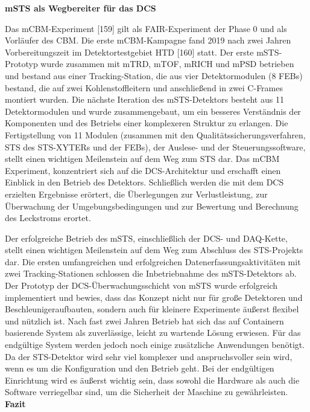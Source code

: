 \bigbreak
\textbf{\gls{mSTS} als Wegbereiter für das DCS}
\bigbreak

Das \gls{mCBM}-Experiment [159] gilt als FAIR-Experiment der Phase 0 und als Vorläufer des CBM. Die erste \gls{mCBM}-Kampagne fand 2019 nach zwei Jahren Vorbereitungszeit im Detektortestgebiet HTD [160] statt. Der erste \gls{mSTS}-Prototyp wurde zusammen mit mTRD, mTOF, mRICH und mPSD betrieben und bestand aus einer Tracking-Station, die aus vier Detektormodulen (8 FEBs) bestand, die auf zwei Kohlenstoffleitern und anschließend in zwei C-Frames montiert wurden. Die nächste Iteration des \gls{mSTS}-Detektors besteht aus 11 Detektormodulen und wurde zusammengebaut, um ein besseres Verständnis der Komponenten und des Betriebs einer komplexeren Struktur zu erlangen. Die Fertigstellung von 11 Modulen (zusammen mit den Qualitätssicherungsverfahren, \gls{STS} des \gls{STS}-XYTERs und der FEBs), der Auslese- und der Steuerungssoftware, stellt einen wichtigen Meilenstein auf dem Weg zum \gls{STS} dar. Das \gls{mCBM} Experiment, konzentriert sich auf die DCS-Architektur und erschafft einen Einblick in den Betrieb des Detektors. Schließlich werden die mit dem DCS erzielten Ergebnisse erörtert, die Überlegungen zur Verlustleistung, zur Überwachung der Umgebungsbedingungen und zur Bewertung und Berechnung des Leckstroms erortet.

Der erfolgreiche Betrieb des \gls{mSTS}, einschließlich der \gls{DCS}- und \gls{DAQ}-Kette, stellt einen wichtigen Meilenstein auf dem Weg zum Abschluss des \gls{STS}-Projekts dar. Die ersten umfangreichen und erfolgreichen Datenerfassungsaktivitäten mit zwei Tracking-Stationen schlossen die Inbetriebnahme des \gls{mSTS}-Detektors ab. Der Prototyp der \gls{DCS}-Überwachungsschicht von \gls{mSTS} wurde erfolgreich implementiert und bewies, dass das Konzept nicht nur für große Detektoren und Beschleunigeraufbauten, sondern auch für kleinere Experimente äußerst flexibel und nützlich ist. Nach fast zwei Jahren Betrieb hat sich das auf Containern basierende System als zuverlässige, leicht zu wartende Lösung erwiesen. Für das endgültige System werden jedoch noch einige zusätzliche Anwendungen benötigt. Da der \gls{STS}-Detektor wird sehr viel komplexer und anspruchsvoller sein wird, wenn es um die Konfiguration und den Betrieb geht. Bei der endgültigen Einrichtung wird es äußerst wichtig sein, dass sowohl die Hardware als auch die Software verriegelbar sind, um die Sicherheit der Maschine zu gewährleisten.
\bigbreak
\textbf{Fazit}
\bigbreak

